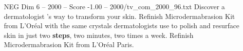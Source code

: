 \begin{textsample}{NEG Dim 6 – 2000 – Score -1.00 – 2000/tv\_com\_2000\_96.txt}  \label{ex:f6_neg_006}
Discover a dermatologist 's way to transform your skin.
Refinish Microdermabrasion Kit from L'Oréal with the same crystals dermatologists use to polish and resurface skin in just two \textbf{steps}, two minutes, two times a week.
Refinish Microdermabrasion Kit from L'Oréal Paris.

\end{textsample}

